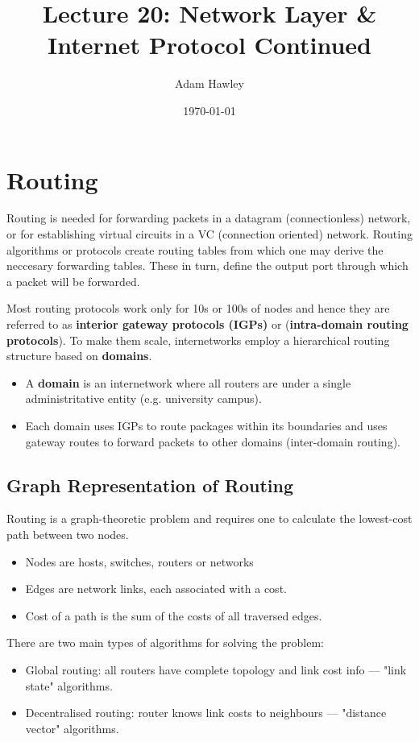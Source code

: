 \documentclass[11pt]{article}
\author{Adam Hawley}
\date{\today}
\title{Lecture 20: Network Layer \& Internet Protocol Continued}
\begin{document}
\maketitle
\tableofcontents


\section{Routing}
\label{sec:org8b89bfd}
Routing is needed for forwarding packets in a datagram (connectionless) network, or for establishing virtual circuits in a VC (connection oriented) network.
Routing algorithms or protocols create routing tables from which one may derive the neccesary forwarding tables.
These in turn, define the output port through which a packet will be forwarded.

Most routing protocols work only for 10s or 100s of nodes and hence they are referred to as \textbf{interior gateway protocols (IGPs)} or (\textbf{intra-domain routing protocols}).
To make them scale, internetworks employ a hierarchical routing structure based on \textbf{domains}.
\begin{itemize}
\item A \textbf{domain} is an internetwork where all routers are under a single administritative entity (e.g. university campus).
\item Each domain uses IGPs to route packages within its boundaries and uses gateway routes to forward packets to other domains (inter-domain routing).
\end{itemize}

\subsection{Graph Representation of Routing}
\label{sec:org5234b52}
Routing is a graph-theoretic problem and requires one to calculate the lowest-cost path between two nodes.
\begin{itemize}
\item Nodes are hosts, switches, routers or networks
\item Edges are network links, each associated with a cost.
\item Cost of a path is the sum of the costs of all traversed edges.
\end{itemize}
There are two main types of algorithms for solving the problem:
\begin{itemize}
\item Global routing: all routers have complete topology and link cost info --- "link state" algorithms.
\item Decentralised routing: router knows link costs to neighbours --- "distance vector" algorithms.
\end{itemize}
\end{document}
